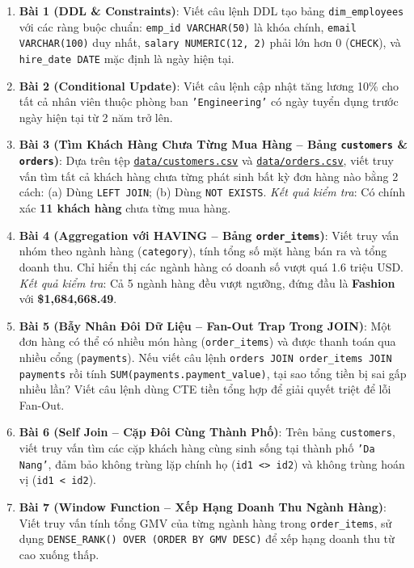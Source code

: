 \begin{baitapbox}
\begin{enumerate}
    \item \textbf{Bài 1 (DDL \& Constraints)}: Viết câu lệnh DDL tạo bảng \texttt{dim\_employees} với các ràng buộc chuẩn: \texttt{emp\_id VARCHAR(50)} là khóa chính, \texttt{email VARCHAR(100)} duy nhất, \texttt{salary NUMERIC(12, 2)} phải lớn hơn 0 (\texttt{CHECK}), và \texttt{hire\_date DATE} mặc định là ngày hiện tại.
    \item \textbf{Bài 2 (Conditional Update)}: Viết câu lệnh cập nhật tăng lương 10\% cho tất cả nhân viên thuộc phòng ban \texttt{'Engineering'} có ngày tuyển dụng trước ngày hiện tại từ 2 năm trở lên.
    \item \textbf{Bài 3 (Tìm Khách Hàng Chưa Từng Mua Hàng -- Bảng \texttt{customers} \& \texttt{orders})}: Dựa trên tệp \href{run:./data/customers.csv}{\texttt{data/customers.csv}} và \href{run:./data/orders.csv}{\texttt{data/orders.csv}}, viết truy vấn tìm tất cả khách hàng chưa từng phát sinh bất kỳ đơn hàng nào bằng 2 cách: (a) Dùng \texttt{LEFT JOIN}; (b) Dùng \texttt{NOT EXISTS}. \textit{Kết quả kiểm tra}: Có chính xác \textbf{11 khách hàng} chưa từng mua hàng.
    \item \textbf{Bài 4 (Aggregation với HAVING -- Bảng \texttt{order\_items})}: Viết truy vấn nhóm theo ngành hàng (\texttt{category}), tính tổng số mặt hàng bán ra và tổng doanh thu. Chỉ hiển thị các ngành hàng có doanh số vượt quá 1.6 triệu USD. \textit{Kết quả kiểm tra}: Cả 5 ngành hàng đều vượt ngưỡng, đứng đầu là \textbf{Fashion} với \textbf{\$1,684,668.49}.
    \item \textbf{Bài 5 (Bẫy Nhân Đôi Dữ Liệu -- Fan-Out Trap Trong JOIN)}: Một đơn hàng có thể có nhiều món hàng (\texttt{order\_items}) và được thanh toán qua nhiều cổng (\texttt{payments}). Nếu viết câu lệnh \texttt{orders JOIN order\_items JOIN payments} rồi tính \texttt{SUM(payments.payment\_value)}, tại sao tổng tiền bị sai gấp nhiều lần? Viết câu lệnh dùng CTE tiền tổng hợp để giải quyết triệt để lỗi Fan-Out.
    \item \textbf{Bài 6 (Self Join -- Cặp Đôi Cùng Thành Phố)}: Trên bảng \texttt{customers}, viết truy vấn tìm các cặp khách hàng cùng sinh sống tại thành phố \texttt{'Da Nang'}, đảm bảo không trùng lặp chính họ (\texttt{id1 <> id2}) và không trùng hoán vị (\texttt{id1 < id2}).
    \item \textbf{Bài 7 (Window Function -- Xếp Hạng Doanh Thu Ngành Hàng)}: Viết truy vấn tính tổng GMV của từng ngành hàng trong \texttt{order\_items}, sử dụng \texttt{DENSE\_RANK() OVER (ORDER BY GMV DESC)} để xếp hạng doanh thu từ cao xuống thấp.

\end{enumerate}
\end{baitapbox}
